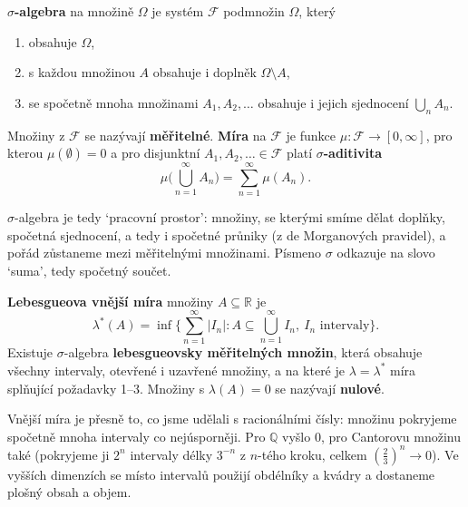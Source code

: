 \begin{definitionbox}
  \textbf{$\sigma$-algebra} na množině $\Omega$ je systém $\mathcal{F}$ podmnožin $\Omega$, který
  \begin{enumerate}
    \item obsahuje $\Omega$,
    \item s každou množinou $A$ obsahuje i doplněk $\Omega\setminus A$,
    \item se spočetně mnoha množinami $A_1, A_2, \dots$ obsahuje i jejich sjednocení $\bigcup_n A_n$.
  \end{enumerate}
  Množiny z $\mathcal{F}$ se nazývají \textbf{měřitelné}. \textbf{Míra} na $\mathcal{F}$ je funkce $\mu\colon\mathcal{F}\to[0, \infty]$, pro kterou $\mu(\emptyset) = 0$ a pro disjunktní $A_1, A_2, \ldots\in\mathcal{F}$ platí \textbf{$\sigma$-aditivita}
  \begin{equation*}
    \mu\Big(\bigcup_{n=1}^{\infty}A_n\Big) = \sum_{n=1}^{\infty}\mu(A_n).
  \end{equation*}
\end{definitionbox}

$\sigma$-algebra je tedy `pracovní prostor': množiny, se kterými smíme dělat doplňky, spočetná sjednocení, a tedy i spočetné průniky (z de Morganových pravidel), a pořád zůstaneme mezi měřitelnými množinami. Písmeno $\sigma$ odkazuje na slovo `suma', tedy spočetný součet.

\begin{definitionbox}
  \textbf{Lebesgueova vnější míra} množiny $A\subseteq\mathbb{R}$ je
  \begin{equation*}
    \lambda^\ast(A) = \inf\Big\{\sum_{n=1}^{\infty}|I_n| : A\subseteq\bigcup_{n=1}^{\infty}I_n,\ I_n\text{ intervaly}\Big\}.
  \end{equation*}
  Existuje $\sigma$-algebra \textbf{lebesgueovsky měřitelných množin}, která obsahuje všechny intervaly, otevřené i uzavřené množiny, a na které je $\lambda = \lambda^\ast$ míra splňující požadavky 1--3. Množiny s $\lambda(A) = 0$ se nazývají \textbf{nulové}.
\end{definitionbox}

Vnější míra je přesně to, co jsme udělali s racionálními čísly: množinu pokryjeme spočetně mnoha intervaly co nejúsporněji. Pro $\mathbb{Q}$ vyšlo $0$, pro Cantorovu množinu také (pokryjeme ji $2^n$ intervaly délky $3^{-n}$ z $n$-tého kroku, celkem $\left(\frac{2}{3}\right)^n\to 0$). Ve vyšších dimenzích se místo intervalů použijí obdélníky a kvádry a dostaneme plošný obsah a objem.


